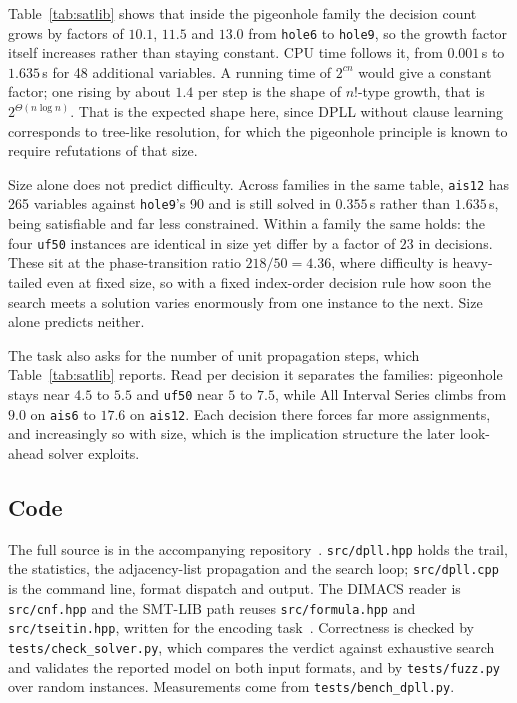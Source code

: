 \documentclass[11pt,a4paper]{article}
\begin{document}


Table~\ref{tab:satlib} shows that inside the pigeonhole family the decision
count grows by factors of $10.1$,
$11.5$ and $13.0$ from \texttt{hole6} to \texttt{hole9}, so the growth factor
itself increases rather than staying constant. CPU time follows it, from
$0.001$\,s to $1.635$\,s for 48 additional variables. A running time of
$2^{cn}$ would give a constant factor; one rising by about $1.4$ per step is
the shape of $n!$-type growth, that is $2^{\Theta(n \log n)}$. That is the
expected shape here, since DPLL without clause learning corresponds to
tree-like resolution, for which the pigeonhole principle is known to require
refutations of that size.

Size alone does not predict difficulty. Across families in the same table,
\texttt{ais12} has 265
variables against \texttt{hole9}'s 90 and is still solved in $0.355$\,s rather
than $1.635$\,s, being satisfiable and far less constrained. Within a family the
same holds: the four \texttt{uf50} instances are identical in size yet differ by
a factor of $23$ in decisions. These sit at the phase-transition ratio
$218/50 = 4.36$, where difficulty is heavy-tailed even at fixed size, so with a
fixed index-order decision rule how soon the search meets a solution varies
enormously from one instance to the next. Size alone predicts neither.

The task also asks for the number of unit propagation steps, which
Table~\ref{tab:satlib} reports. Read per decision it separates the families:
pigeonhole stays near $4.5$ to $5.5$ and \texttt{uf50} near $5$ to $7.5$, while
All Interval Series climbs from $9.0$ on \texttt{ais6} to $17.6$ on
\texttt{ais12}. Each decision there forces far more assignments, and
increasingly so with size, which is the implication structure the later
look-ahead solver exploits.

\subsection*{Code}

\begin{sloppypar}
The full source is in the accompanying repository~\cite{repo}.
\texttt{src/dpll.hpp} holds the trail, the statistics, the adjacency-list
propagation and the search loop; \texttt{src/dpll.cpp} is the command line,
format dispatch and output. The DIMACS reader is \texttt{src/cnf.hpp} and the
SMT-LIB path reuses \texttt{src/formula.hpp} and \texttt{src/tseitin.hpp},
written for the encoding task~\cite{task1}. Correctness is checked by
\texttt{tests/check\_solver.py},
which compares the verdict against exhaustive search and validates the reported
model on both input formats, and by \texttt{tests/fuzz.py} over random
instances. Measurements come from \texttt{tests/bench\_dpll.py}.
\end{sloppypar}
\end{document}
